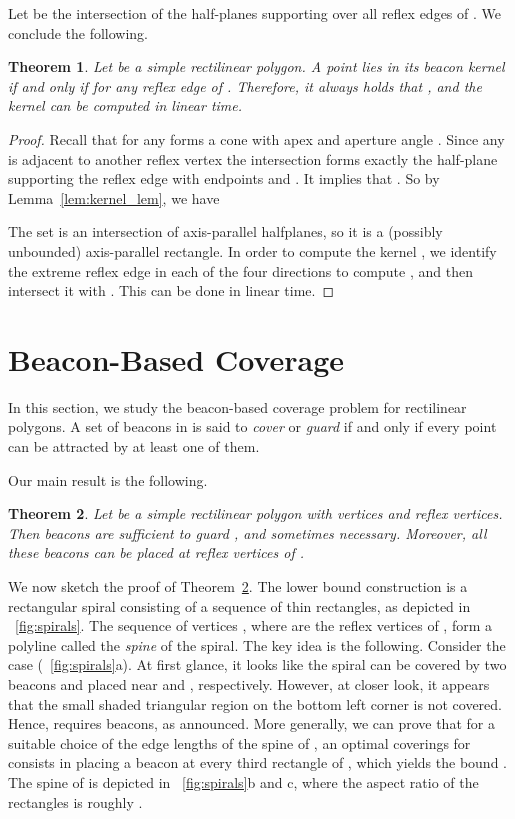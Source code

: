 \documentclass[11pt]{article}
\newtheorem{theorem}{Theorem}
\theoremstyle{definition}
\begin{document}
Let  be the intersection of the half-planes  supporting 
over all reflex edges  of . We conclude the following.
\begin{theorem} \label{thm:kernel}
 Let  be a simple rectilinear polygon.
 A point  lies in its beacon kernel  if and only if
  for any reflex edge  of .
 Therefore, it always holds that , and
 the kernel  can be computed in linear time.
\end{theorem}
\begin{proof}
Recall that  for any  forms a cone with apex  and aperture angle .
Since any  is adjacent to another reflex vertex 
the intersection  forms exactly the half-plane  supporting the reflex edge 
with endpoints  and .
It implies that .
So by Lemma~\ref{lem:kernel_lem}, we have


The set  is an intersection of axis-parallel halfplanes,
so it is a (possibly unbounded) axis-parallel rectangle.
In order to compute the kernel ,
we identify the extreme reflex edge in each of the four directions to compute ,
and then intersect it with .
This can be done in linear time.
\end{proof}

\section{Beacon-Based Coverage} \label{sec:coverage}


In this section, we study the beacon-based coverage problem for rectilinear polygons.
A set of beacons in  is said to \emph{cover} or \emph{guard} 
if and only if every point  can be attracted by at least one of them.

Our main result is the following. 
\begin{theorem} \label{thm:covering}
 Let  be a simple rectilinear polygon  with  vertices and
  reflex vertices.
 Then  beacons are sufficient
 to guard , and sometimes necessary.
 Moreover, all these beacons can be placed at reflex vertices of .
\end{theorem}

We now sketch the proof of Theorem~\ref{thm:covering}. The lower bound construction is 
a rectangular spiral  consisting of a sequence of  thin rectangles, as depicted in 
\figurename~\ref{fig:spirals}. The sequence of vertices , where 
are the reflex vertices of ,  form
a polyline called the {\it spine} of the spiral. The key idea is the following. Consider
the case  (\figurename~\ref{fig:spirals}a). At first glance, it looks like the spiral
can be covered by two beacons  and  placed near  and , respectively.
However, at closer look, it appears that the small shaded triangular region on the bottom left 
corner is not covered. Hence,  requires  beacons, as announced.
More generally, we can prove that  for a suitable choice of the edge lengths of the
spine of , an optimal coverings for  consists in placing a
beacon at every third rectangle of , which yields the bound .
The spine of  is depicted in \figurename~\ref{fig:spirals}b and c, where the aspect
ratio of the rectangles is roughly .
\end{document}
